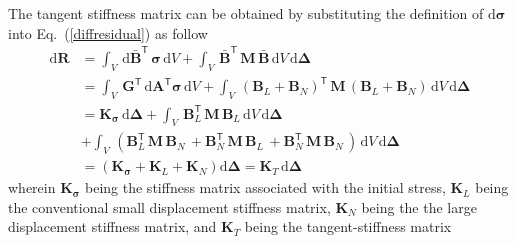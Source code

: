 The tangent stiffness matrix can be obtained by substituting the definition of $\mathrm{d} \boldsymbol{\sigma}$ into Eq.~(\ref{diffresidual}) as follow \cite{Elseifi98}
\begin{equation}
\begin{aligned}
\mathrm{d} \mathbf{R} & = \int_{V} \, \mathrm{d} \bar{\mathbf{B}}^{\mathsf{T}} \, \boldsymbol{\sigma} \, \mathrm{d} V + \int_{V} \, \bar{\mathbf{B}}^{\mathsf{T}} \, \mathbf{M} \, \bar{\mathbf{B}} \, \mathrm{d} V \, \mathrm{d} \boldsymbol{\Delta} \\ 
& = \int_{V} \, \mathbf{G}^{\mathsf{T}} \, \mathrm{d} \mathbf{A}^{\mathsf{T}} \boldsymbol{\sigma} \, \mathrm{d} V + \int_{V} \, \left(\mathbf{B}_L + \mathbf{B}_N \right)^{\mathsf{T}} \, \mathbf{M} \,  \left(\mathbf{B}_L + \mathbf{B}_N \right) \, \mathrm{d} V \, \mathrm{d} \boldsymbol{\Delta} \\ 
& = \mathbf{K}_{\boldsymbol{\sigma}} \, \mathrm{d} \boldsymbol{\Delta} + \int_{V} \, \mathbf{B}_L^{\mathsf{T}} \, \mathbf{M} \, \mathbf{B}_L \, \mathrm{d} V \, \mathrm{d} \boldsymbol{\Delta}\\ 
& + \int_{V} \,  \left(\mathbf{B}_L^{\mathsf{T}} \, \mathbf{M} \, \mathbf{B}_N \, + \mathbf{B}_N^{\mathsf{T}} \, \mathbf{M} \, \mathbf{B}_L \, + \mathbf{B}_N^{\mathsf{T}} \, \mathbf{M} \, \mathbf{B}_N \,  \right) \, \mathrm{d} V \, \mathrm{d} \boldsymbol{\Delta}\\
& = \left(\mathbf{K}_{\boldsymbol{\sigma}} + \mathbf{K}_L + \mathbf{K}_N\right)\mathrm{d} \boldsymbol{\Delta} = \mathbf{K}_T \, \mathrm{d} \boldsymbol{\Delta}
\end{aligned} 
\end{equation} 
wherein $\mathbf{K}_{\boldsymbol{\sigma}}$ being the stiffness matrix associated with the initial stress, $\mathbf{K}_L$ being the conventional small displacement stiffness matrix, $\mathbf{K}_N$ being the the large displacement stiffness matrix, and $\mathbf{K}_T$ being the tangent-stiffness matrix 

